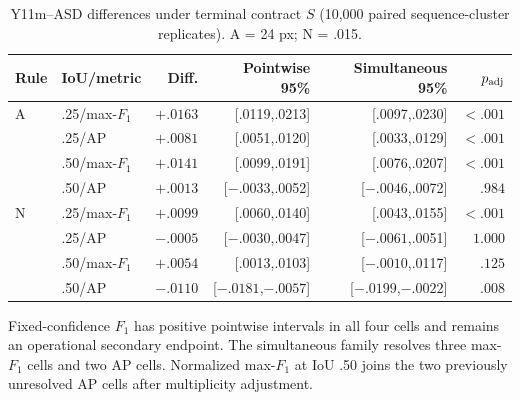 \documentclass[journal]{IEEEtran}
\begin{document}
\begin{table}[!t]
\centering
\caption{Y11m--ASD differences under terminal contract $S$ (10,000 paired sequence-cluster replicates). A = 24 px; N = .015.}\label{tab:rank}
\tiny
\setlength{\tabcolsep}{1.05pt}\renewcommand{\arraystretch}{.94}
\begin{tabular}{llrrrr}
\toprule
Rule & IoU/metric & Diff. & Pointwise 95\% & Simultaneous 95\% & $p_{\rm adj}$\\
\midrule
A & .25/max-$F_1$ & $+.0163$ & [.0119,.0213] & [.0097,.0230] & $<.001$\\
  & .25/AP & $+.0081$ & [.0051,.0120] & [.0033,.0129] & $<.001$\\
  & .50/max-$F_1$ & $+.0141$ & [.0099,.0191] & [.0076,.0207] & $<.001$\\
  & .50/AP & $+.0013$ & [$-.0033$,.0052] & [$-.0046$,.0072] & $.984$\\
\midrule
N & .25/max-$F_1$ & $+.0099$ & [.0060,.0140] & [.0043,.0155] & $<.001$\\
  & .25/AP & $-.0005$ & [$-.0030$,.0047] & [$-.0061$,.0051] & $1.000$\\
  & .50/max-$F_1$ & $+.0054$ & [.0013,.0103] & [$-.0010$,.0117] & $.125$\\
  & .50/AP & $-.0110$ & [$-.0181$,$-.0057$] & [$-.0199$,$-.0022$] & $.008$\\
\bottomrule
\end{tabular}
\end{table}

Fixed-confidence $F_1$ has positive pointwise intervals in all four cells and remains an operational secondary endpoint. The simultaneous family resolves three max-$F_1$ cells and two AP cells. Normalized max-$F_1$ at IoU .50 joins the two previously unresolved AP cells after multiplicity adjustment.
\end{document}
